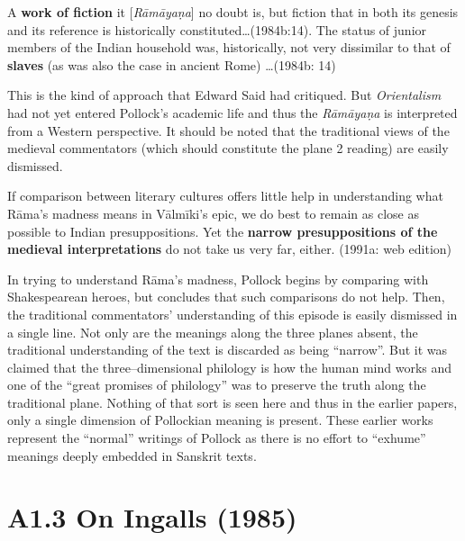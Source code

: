 {{\begin{myquote}
A \textbf{work of fiction} it [\textit{Rāmāyaṇa}] no doubt is, but fiction that in both its genesis and its reference is historically constituted…(1984b:14). The status of junior members of the Indian household was, historically, not very dissimilar to that of \textbf{slaves} (as was also the case in ancient Rome) …(1984b: 14)
\end{myquote}

This is the kind of approach that Edward Said had critiqued. But \textit{Orientalism }had not yet entered Pollock’s academic life and thus the \textit{Rāmāyaṇa }is interpreted from a Western perspective. It should be noted that the traditional views of the medieval commentators (which should constitute the plane 2 reading) are easily dismissed.

\begin{myquote}
If comparison between literary cultures offers little help in understanding what Rāma’s madness means in Vālmīki’s epic, we do best to remain as close as possible to Indian presuppositions. Yet the \textbf{narrow presuppositions of the medieval interpretations }do not take us very far, either. (1991a: web edition)
\end{myquote}

In trying to understand Rāma’s madness, Pollock begins by comparing with Shakespearean heroes, but concludes that such comparisons do not help. Then, the traditional commentators' understanding of this episode is easily dismissed in a single line. Not only are the meanings along the three planes absent, the traditional understanding of the text is discarded as being “narrow”. But it was claimed that the three–dimensional philology is how the human mind works and one of the “great promises of philology” was to preserve the truth along the traditional plane. Nothing of that sort is seen here and thus in the earlier papers, only a single dimension of Pollockian meaning is present. These earlier works represent the “normal” writings of Pollock as there is no effort to “exhume” meanings deeply embedded in Sanskrit texts.

\vspace{-.3cm}

\section*{A1.3 On Ingalls (1985)}

}}
